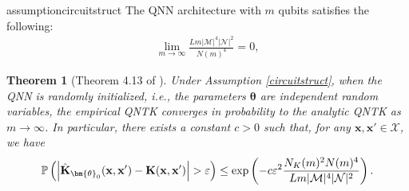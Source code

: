 \documentclass[pdflatex,sn-mathphys-num]{sn-jnl}%
\theoremstyle{thmstyleone}%
\newtheorem{theorem}{Theorem}%
\theoremstyle{thmstyletwo}%
\theoremstyle{thmstylethree}%
\newcommand{\xbf}{\mathbf{x}}
\newcommand{\Kbf}{\mathbf{K}}
\newcommand{\thetabf}{\bm{\theta}}
\begin{document}
\begin{restatable}{assumption}{circuitstruct}\label{circuitstruct}
The QNN architecture with $m$ qubits satisfies the following:
\begin{align} \lim_{m\rightarrow \infty} \frac{Lm |\mathcal{M}|^4|\mathcal{N}|^2}{N(m)^4}=0, \label{eq:condition} \end{align} 
\end{restatable}

\begin{theorem}[Theorem 4.13 of \cite{Girardi2025}] \label{thm:cvgQNTK}
Under Assumption \ref{circuitstruct}, when the QNN is randomly initialized, i.e., the parameters $\thetabf$ are
independent random variables, the empirical QNTK converges in probability to the analytic
QNTK as $m \rightarrow \infty$. In particular,  there exists a constant $c>0$ such that, for any $\xbf,\xbf' \in \mathcal{X}$, we
have \begin{align}
  \mathbb{P} \left( \Bigl|\hat{\Kbf}_{\thetabf_0}(\xbf,\xbf')- {\Kbf}(\xbf,\xbf')\Bigr| > \varepsilon \right) \leq \exp \left(-c \varepsilon^2 \frac{N_K(m)^2N(m)^4}{Lm |\mathcal{M}|^4|\mathcal{N}|^2}\right).
\end{align}   %

\end{theorem} 
\end{document}
